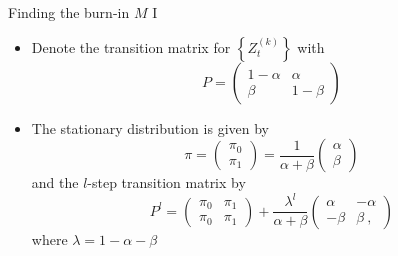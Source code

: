 \begin{frame}{Finding the burn-in $M$ I}
\begin{itemize}
    \item Denote the transition matrix for $\left\{Z_t^{(k)}\right\}$ with
    \begin{equation}
    P = \left( {\begin{array}{*{20}{c}}
  {1 - \alpha }&\alpha  \\
  \beta &{1 - \beta }
\end{array}} \right)
\end{equation}
\item The stationary distribution is given by
\begin{equation}
\pi  = \left( {\begin{array}{*{20}{c}}
  {{\pi _0}} \\
  {{\pi _1}}
\end{array}} \right) = \frac{1}{{\alpha  + \beta }}\left( {\begin{array}{*{20}{c}}
  \alpha  \\
  \beta
\end{array}} \right)
\end{equation}
and the $l$-step transition matrix by
\begin{equation}
{P^l} = \left( {\begin{array}{*{20}{c}}
  {{\pi _0}}&{{\pi _1}} \\
  {{\pi _0}}&{{\pi _1}}
\end{array}} \right) + \frac{{{\lambda ^l}}}{{\alpha  + \beta }}\left( {\begin{array}{*{20}{c}}
  \alpha &{ - \alpha } \\
  { - \beta }&\beta \: ,
\end{array}} \right)
\end{equation}
where $\lambda=1-\alpha-\beta$
\end{itemize}
\end{frame}


